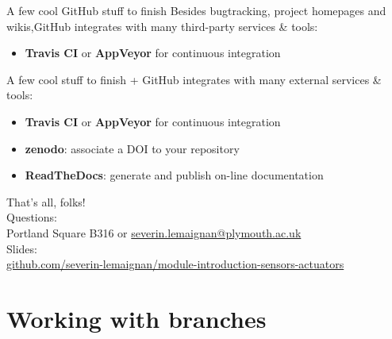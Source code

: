 \documentclass[compress]{beamer}
\begin{document}
\begin{frame}{A few cool GitHub stuff to finish}
    Besides bugtracking, project homepages and wikis,GitHub integrates with many
    third-party services \& tools:

    \begin{itemize}
        \item {\bf Travis CI} or {\bf AppVeyor} for continuous integration
    \end{itemize}
\end{frame}


\begin{frame}{A few cool stuff to finish}
    + GitHub integrates with many external services 
    \& tools:

    \begin{itemize}
        \item {\bf Travis CI} or {\bf AppVeyor} for continuous integration
        \item {\bf zenodo}: associate a DOI to your repository
        \item {\bf ReadTheDocs}: generate and publish on-line 
            documentation
    \end{itemize}
\end{frame}




\begin{frame}{}
    \begin{center}
        \Large
        That's all, folks!\\[2em]
        \normalsize
        Questions:\\
        Portland Square B316 or \url{severin.lemaignan@plymouth.ac.uk} \\[1em]

        Slides:\\
        \href{https://github.com/severin-lemaignan/module-introduction-sensors-actuators}{\small
        github.com/severin-lemaignan/module-introduction-sensors-actuators}


    \end{center}
\end{frame}

\appendix



\section{Working with branches}
\end{document}
